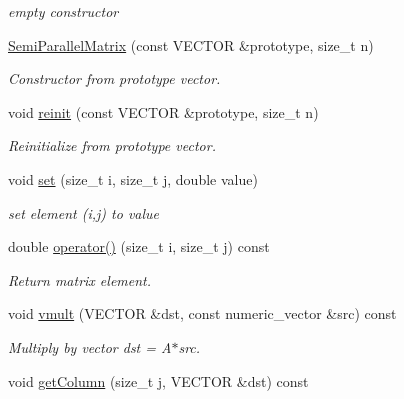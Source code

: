 \begin{DoxyCompactItemize}
\begin{DoxyCompactList}\small\item\em empty constructor \item\end{DoxyCompactList}\item 
\hyperlink{classnatrium_1_1SemiParallelMatrix_a6c8fff84bcf91369e0323eb0a762fd65}{SemiParallelMatrix} (const VECTOR \&prototype, size\_\-t n)
\begin{DoxyCompactList}\small\item\em Constructor from prototype vector. \item\end{DoxyCompactList}\item 
void \hyperlink{classnatrium_1_1SemiParallelMatrix_ae84190bdc4b753f6dc874d229d0b11a7}{reinit} (const VECTOR \&prototype, size\_\-t n)
\begin{DoxyCompactList}\small\item\em Reinitialize from prototype vector. \item\end{DoxyCompactList}\item 
void \hyperlink{classnatrium_1_1SemiParallelMatrix_a232fbaa6ca412b4f98d9c6aab19254de}{set} (size\_\-t i, size\_\-t j, double value)
\begin{DoxyCompactList}\small\item\em set element (i,j) to value \item\end{DoxyCompactList}\item 
double \hyperlink{classnatrium_1_1SemiParallelMatrix_afb8ed4b8c4a62a0271ea7b512f275555}{operator()} (size\_\-t i, size\_\-t j) const 
\begin{DoxyCompactList}\small\item\em Return matrix element. \item\end{DoxyCompactList}\item 
void \hyperlink{classnatrium_1_1SemiParallelMatrix_a544535d18e218d58541bf4a275ee96b2}{vmult} (VECTOR \&dst, const numeric\_\-vector \&src) const 
\begin{DoxyCompactList}\small\item\em Multiply by vector dst = A$\ast$src. \item\end{DoxyCompactList}\item 
void \hyperlink{classnatrium_1_1SemiParallelMatrix_a573e34e163358f87aee0f22742deda66}{getColumn} (size\_\-t j, VECTOR \&dst) const 

\end{DoxyCompactItemize}

